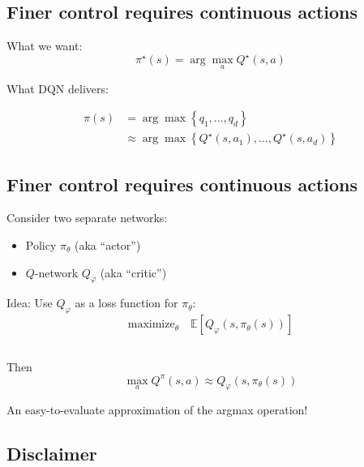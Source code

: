 \documentclass[
  letterpaper,
  DIV=11,
  numbers=noendperiod,
  oneside]{scrartcl}
\providecommand{\tightlist}{%
  \setlength{\itemsep}{0pt}\setlength{\parskip}{0pt}}\usepackage{longtable,booktabs,array}
\begin{document}

\subsection{Finer control requires continuous
actions}\label{finer-control-requires-continuous-actions}

What we want: \[
\pi^\star (s) = \arg \max_{a} Q^\star (s,a)
\]

What DQN delivers:

\begin{align}
\pi(s) &= \arg \max \left\{ q_1, \ldots, q_d \right\} \\
&\approx \arg \max \left\{ Q^\star(s, a_1), \ldots, Q^\star(s, a_d)\right\}
\end{align}

\subsection{Finer control requires continuous
actions}\label{finer-control-requires-continuous-actions-1}

Consider two separate networks:

\begin{itemize}
\tightlist
\item
  Policy \(\pi_{\theta}\) (aka ``actor'')
\item
  \(Q\)-network \(Q_\varphi\) (aka ``critic'')
\end{itemize}

Idea: Use \(Q_\varphi\) as a loss function for \(\pi_{\theta}\):
\[\text{maximize}_{\theta} \quad \mathbb{E} \left[ Q_\varphi(s, \pi_\theta (s)) \right]\]

\subsection{}\label{section-16}

Then \[\max_{a} Q^\pi (s,a) \approx Q_\varphi (s, \pi_{\theta} (s))\]

An easy-to-evaluate approximation of the argmax operation!

\subsection{Disclaimer}\label{disclaimer}
\end{document}
